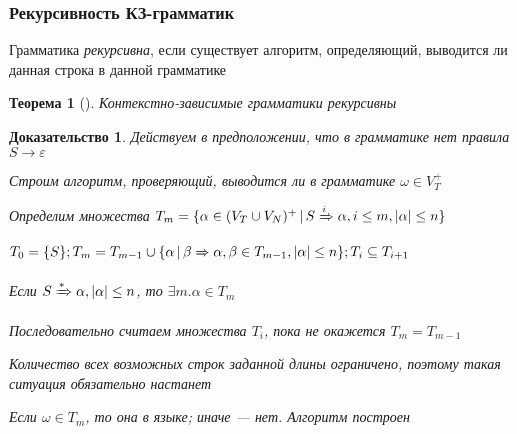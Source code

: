 \documentclass{beamer}
\newtheorem{rutheorem}{Теорема}
\newtheorem{ruproof}{Доказательство}
\newcommand{\derive}[0]{\xRightarrow[]{*}}
\newcommand{\derives}[0]{\xRightarrow[]{}}
\newcommand{\derivek}[1]{\xRightarrow[]{#1}}
\begin{document}
\begin{frame}[fragile]
  \transwipe[direction=90]
  \frametitle{Рекурсивность КЗ-грамматик}
  Грамматика \textit{рекурсивна}, если существует алгоритм, определяющий, выводится ли данная строка в данной грамматике
  
  \begin{rutheorem}[]
  Контекстно-зависимые грамматики рекурсивны
  \end{rutheorem}
  
  \begin{ruproof}
  Действуем в предположении, что в грамматике нет правила $S \rightarrow \varepsilon$
  
  Строим алгоритм, проверяющий, выводится ли в грамматике $\omega \in V_T^+$
  
  Определим множества $T_m = \{ \alpha \in (V_T \cup V_N)^+\, | \, S \derivek{i} \alpha, i \leq m, | \alpha | \leq n \}$
  
  $T_0 =\{ S \}; T_m = T_{m-1} \cup \{ \alpha \, | \, \beta \derives \alpha, \beta \in T_{m-1}, | \alpha | \leq n \}; T_i \subseteq T_{i+1}$ 
  
  Если $S \derive \alpha, | \alpha | \leq n $, то $\exists m. \alpha \in T_m$
  
  Последовательно считаем множества $T_i$, пока не окажется $T_m = T_{m-1}$
  
  Количество всех возможных строк заданной длины ограничено, поэтому такая ситуация обязательно настанет
  
  Если $\omega \in T_m$, то она в языке; иначе --- нет. Алгоритм построен
  \end{ruproof}
  
\end{frame}
\end{document}

